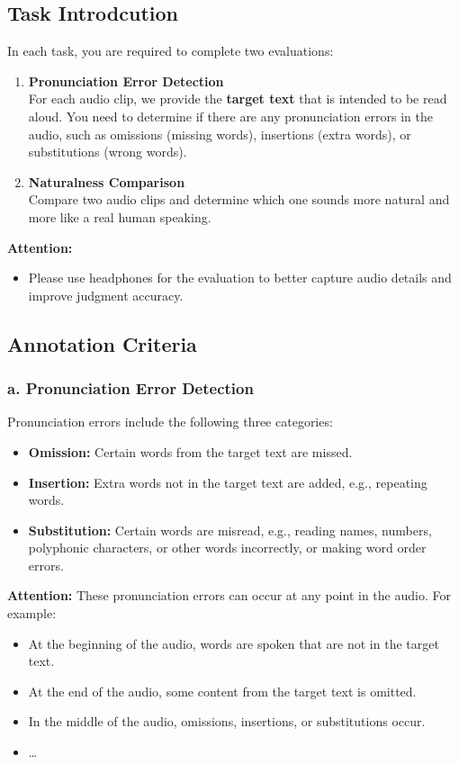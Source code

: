 \documentclass[]{bytedance_seed}
\begin{document}
\begin{promptbox}
\subsection*{Task Introdcution}

In each task, you are required to complete two evaluations:
\begin{enumerate}
    \item \textbf{Pronunciation Error Detection} \\
    For each audio clip, we provide the \textbf{target text} that is intended to be read aloud. You need to determine if there are any pronunciation errors in the audio, such as omissions (missing words), insertions (extra words), or substitutions (wrong words).
    
    \item \textbf{Naturalness Comparison} \\
    Compare two audio clips and determine which one sounds more natural and more like a real human speaking.
\end{enumerate}

\textbf{Attention:}
\begin{itemize}
    \item Please use headphones for the evaluation to better capture audio details and improve judgment accuracy.
\end{itemize}

\subsection*{Annotation Criteria}
\subsubsection*{a. Pronunciation Error Detection}
Pronunciation errors include the following three categories:
\begin{itemize}
    \item \textbf{Omission:} Certain words from the target text are missed.
    \item \textbf{Insertion:} Extra words not in the target text are added, e.g., repeating words.
    \item \textbf{Substitution:} Certain words are misread, e.g., reading names, numbers, polyphonic characters, or other words incorrectly, or making word order errors.
\end{itemize}

\textbf{Attention:} These pronunciation errors can occur at any point in the audio. For example:
\begin{itemize}
    \item At the beginning of the audio, words are spoken that are not in the target text.
    \item At the end of the audio, some content from the target text is omitted.
    \item In the middle of the audio, omissions, insertions, or substitutions occur.
    \item \dots
\end{itemize}


\end{promptbox}
\end{document}

